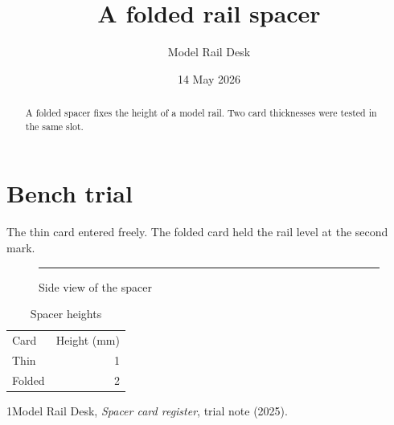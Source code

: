 \documentclass[aps,preprint,showkeys]{revtex4-2}
\begin{document}
\title{A folded rail spacer}\author{Model Rail Desk}\date{14 May 2026}\begin{abstract}A folded spacer fixes the height of a model rail. Two card thicknesses were tested in the same slot.\end{abstract}\maketitle
\section{Bench trial}
The thin card entered freely. The folded card held the rail level at the second mark.
\begin{figure}[ht]\centering\rule{28mm}{2mm}\caption{Side view of the spacer}\end{figure}
\begin{table}[ht]\centering\begin{tabular}{lr}Card&Height (mm)\\Thin&1\\Folded&2\end{tabular}\caption{Spacer heights}\end{table}
\begin{thebibliography}{1}Model Rail Desk, \emph{Spacer card register}, trial note (2025).\end{thebibliography}
\end{document}
